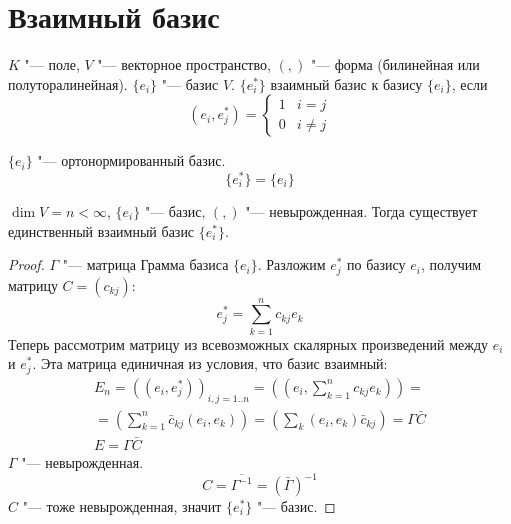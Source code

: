 \section{Взаимный базис}

\begin{Def}
	$K$ "--- поле, $V$ "---  векторное пространство, $(,)$ "--- форма (билинейная или полуторалинейная).
	$\{e_i\}$ "--- базис $V$.
	$\{e_i^*\}$  взаимный базис к базису $\{e_i\}$, если
	\[ (e_i, e_j^*) = \begin{cases} 1 & i = j \\ 0 & i \ne j \end{cases} \]
\end{Def}

\begin{exmp}
	$\{e_i\}$ "--- ортонормированный базис.
	\[ \{e_i^*\} = \{e_i\} \]
\end{exmp}

\begin{theorem}
	$\dim V = n < \infty$, $\{e_i\}$ "--- базис, $(, )$ "--- невырожденная.
	Тогда существует единственный взаимный базис $\{e_i^*\}$.
\end{theorem}

\begin{proof}
	$\Gamma$ "--- матрица Грамма базиса $\{e_i\}$.
	Разложим $e_j^*$ по базису $e_i$, получим матрицу $C = (c_{kj})$:
	\[ e_j^* = \sum_{k=1}^n c_{kj} e_k \]
	Теперь рассмотрим матрицу из всевозможных скалярных произведений между $e_i$ и $e_j^*$.
	Эта матрица единичная из условия, что базис взаимный:
	\begin{gather*}
		E_n = ((e_i, e_j^*))_{i, j = 1..n} = \left(\left(e_i, \sum_{k = 1}^n c_{kj}e_k\right)\right) = \\
		= \left(\sum_{k=1}^n \bar c_{kj} (e_i, e_k)\right) = \left(\sum_{k} (e_i, e_k) \bar c_{kj} \right) = \Gamma \bar C \\
		E = \Gamma \bar C
	\end{gather*}
	$\Gamma$ "--- невырожденная.
	\[ C = \overline{\Gamma^{-1}} = (\bar \Gamma)^{-1} \]
	$C$ "--- тоже невырожденная, значит $\{e_i^*\}$ "--- базис.
\end{proof}